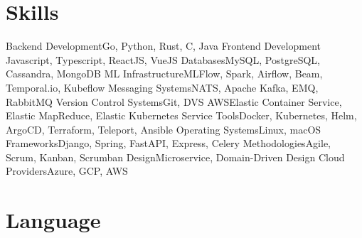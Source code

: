 \section{Skills}

\cvline%
{Backend Development}{Go, Python, Rust, C, Java}
\cvline%
{Frontend Development}
{Javascript, Typescript, ReactJS, VueJS}
\cvline%
{Databases}{MySQL, PostgreSQL, Cassandra, MongoDB}
\cvline%
{ML Infrastructure}{MLFlow, Spark, Airflow, Beam, Temporal.io, Kubeflow}
\cvline%
{Messaging Systems}{NATS, Apache Kafka, EMQ, RabbitMQ}
\cvline%
{Version Control Systems}{Git, DVS}
\cvline%
{AWS}{Elastic Container Service, Elastic MapReduce, Elastic Kubernetes Service}
\cvline%
{Tools}{Docker, Kubernetes, Helm, ArgoCD, Terraform, Teleport, Ansible}
\cvline%
{Operating Systems}{Linux, macOS}
\cvline%
{Frameworks}{Django, Spring, FastAPI, Express, Celery}
\cvline%
{Methodologies}{Agile, Scrum, Kanban, Scrumban}
\cvline%
{Design}{Microservice, Domain-Driven Design}
\cvline%
{Cloud Providers}{Azure, GCP, AWS}

\section{Language}


\emptysection{}\closesection{}
